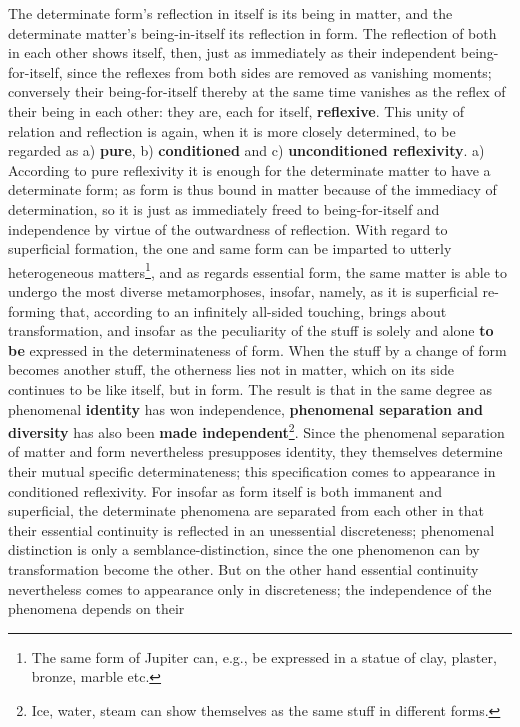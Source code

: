 \documentclass[12pt,a4paper,openany]{book}
\newcommand{\opage}[1]{\marginnote{\footnotesize\textit{[#1]}}}
\begin{document}
The determinate form's reflection in itself is its being
in matter, and the determinate matter's being-in-itself its
reflection in form. The reflection of both in each other shows
itself, then, just as immediately as their independent being-for-itself,
since the reflexes from both sides are removed as
vanishing moments; conversely their being-for-itself
thereby at the same time vanishes as the reflex of their being in
each other: they are, each for itself, \textbf{reflexive}. This
unity of relation and reflection is again, when it is
more closely determined, to be regarded as a) \textbf{pure},
b) \textbf{conditioned} and c) \textbf{unconditioned reflexivity}.
a) According to pure reflexivity it is enough for the determinate
matter to have a determinate form; as form is thus bound in matter because of the immediacy of determination, so it is just as
immediately freed to being-for-itself and independence by
virtue of the outwardness of reflection. With regard
to superficial formation, the one and same
\setcounter{footnote}{0}%
\opage{154}form can be imparted to utterly heterogeneous matters\footnote{The same form of Jupiter can, e.g., be expressed in a statue of clay, plaster, bronze, marble etc.},
and as regards essential form, the same
matter is able to undergo the most diverse
metamorphoses, insofar, namely, as it is superficial
re-forming that, according to an infinitely all-sided
touching, brings about transformation, and insofar as
the peculiarity of the stuff is solely and alone
\textbf{to be} expressed in the determinateness of form. When the stuff
by a change of form becomes another stuff,
the otherness lies not in matter, which on its
side continues to be like itself, but in form.
The result is that in the same degree as phenomenal
\textbf{identity} has won independence,
\textbf{phenomenal separation and} \textbf{diversity} has also
been \textbf{made independent}\footnote{Ice, water, steam can show themselves as the same stuff in different forms.}. Since the phenomenal separation of matter and form
nevertheless presupposes identity, they themselves determine
their mutual specific determinateness; this specification
comes to appearance in conditioned reflexivity.
For insofar as form itself is both immanent
and superficial, the determinate phenomena are separated
from each other in that their essential continuity
is reflected in an unessential discreteness; phenomenal
distinction is only a semblance-distinction, since the
one phenomenon can by transformation become the
other. But on the other hand essential
continuity nevertheless comes to appearance only in discreteness; the independence of the phenomena depends on their
\end{document}
